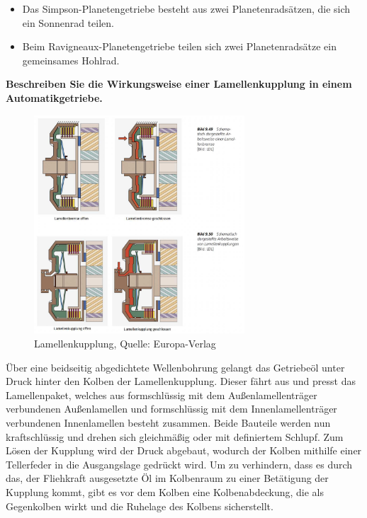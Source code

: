 \begin{itemize}
\item
  Das Simpson-Planetengetriebe besteht aus zwei Planetenradsätzen, die
  sich ein Sonnenrad teilen.
\item
  Beim Ravigneaux-Planetengetriebe teilen sich zwei Planetenradsätze ein
  gemeinsames Hohlrad.
\end{itemize}

\newpage

\textbf{Beschreiben Sie die Wirkungsweise einer Lamellenkupplung in
einem Automatikgetriebe.}

\begin{figure}[!ht]%
\centering
\includegraphics[width=0.7\textwidth]{images/Automatikgetriebe/Automatikgetriebe-12.pdf}
\caption{Lamellenkupplung, Quelle: Europa-Verlag}
\end{figure}

Über eine beidseitig abgedichtete Wellenbohrung gelangt das Getriebeöl
unter Druck hinter den Kolben der Lamellenkupplung. Dieser fährt aus und
presst das Lamellenpaket, welches aus formschlüssig mit dem
Außenlamellenträger verbundenen Außenlamellen und formschlüssig mit dem
Innenlamellenträger verbundenen Innenlamellen besteht zusammen. Beide
Bauteile werden nun kraftschlüssig und drehen sich gleichmäßig oder mit
definiertem Schlupf. Zum Lösen der Kupplung wird der Druck abgebaut,
wodurch der Kolben mithilfe einer Tellerfeder in die Ausgangslage
gedrückt wird. Um zu verhindern, dass es durch das, der Fliehkraft
ausgesetzte Öl im Kolbenraum zu einer Betätigung der Kupplung kommt,
gibt es vor dem Kolben eine Kolbenabdeckung, die als Gegenkolben wirkt
und die Ruhelage des Kolbens sicherstellt.

